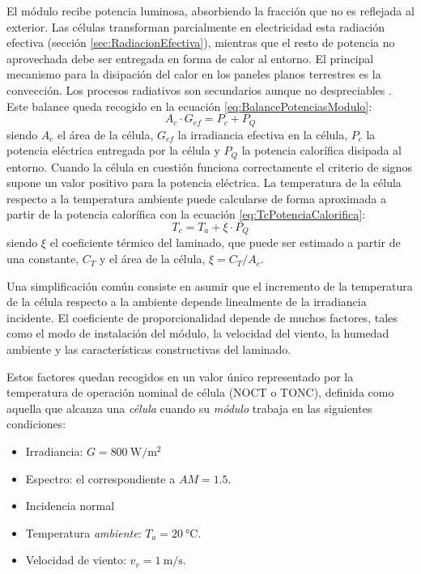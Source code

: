 El módulo recibe potencia luminosa, absorbiendo la fracción que no
es reflejada al exterior. Las células transforman parcialmente en
electricidad esta radiación efectiva (sección \ref{sec:RadiacionEfectiva}),
mientras que el resto de potencia no aprovechada debe ser entregada
en forma de calor al entorno. El principal mecanismo para la disipación
del calor en los paneles planos terrestres es la convección. Los procesos
radiativos son secundarios aunque no despreciables \cite{Luque.Hegedus2003}.
Este balance queda recogido en la ecuación \ref{eq:BalancePotenciasModulo}:
\begin{equation}
A_{c}\cdot G_{ef}=P_{c}+P_{Q}\label{eq:BalancePotenciasModulo}\end{equation}
siendo $A_{c}$ el área de la célula, $G_{ef}$ la irradiancia efectiva
en la célula, $P_{c}$ la potencia eléctrica entregada por la célula
y $P_{Q}$
la potencia calorífica disipada al entorno. Cuando la célula en cuestión
funciona correctamente el criterio de signos supone un valor positivo
para la potencia eléctrica. La temperatura de la célula respecto a
la temperatura ambiente puede calcularse de forma aproximada a partir
de la potencia calorífica con la ecuación \ref{eq:TcPotenciaCalorifica}:\begin{equation}
T_{c}=T_{a}+\xi\cdot P_{Q}\label{eq:TcPotenciaCalorifica}\end{equation}
siendo $\xi$ el coeficiente térmico del laminado, que puede ser
estimado a partir de una constante, $C_{T}$ y el área de la célula,
$\xi=C_{T}/A_{c}$. 

Una simplificación común consiste en asumir que el incremento de la
temperatura de la célula respecto a la ambiente depende linealmente
de la irradiancia incidente. El coeficiente de proporcionalidad depende
de muchos factores, tales como el modo de instalación del módulo,
la velocidad del viento, la humedad ambiente y las características
constructivas del laminado. 

Estos factores quedan recogidos en un valor único representado por
la temperatura de operación nominal de célula (NOCT o TONC), definida
como aquella que alcanza una \emph{célula} cuando su \emph{módulo}
trabaja en las siguientes condiciones: 
\needspace{5\onelineskip}
\begin{itemize}
\item Irradiancia: $G=\SI{800}{\watt\per\meter\squared}$
\item Espectro: el correspondiente a $AM=1.5$.
\item Incidencia normal
\item Temperatura \emph{ambiente}: $T_{a}=\SI{20}{\celsius}$. 
\item Velocidad de viento: $v_{v}=\SI{1}{\meter\per\second}$.
\end{itemize}

